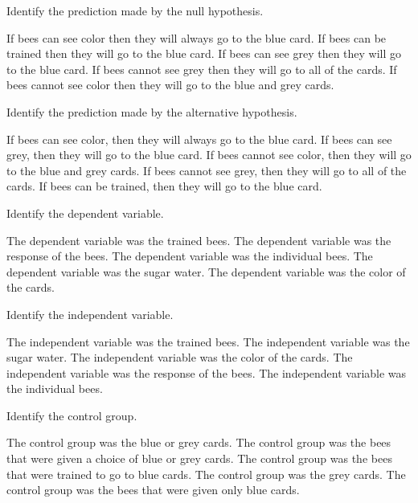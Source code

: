\question
Identify the prediction made by the null hypothesis.

\begin{choices}
\choice If bees can see color then they will always go to the blue card.
\choice If bees can be trained then they will go to the blue card.
\choice If bees can see grey then they will go to the blue card.
\choice If bees cannot see grey then they will go to all of the cards.
\correctchoice If bees cannot see color then they will go to the blue and grey cards.
\end{choices}

\question
Identify the prediction made by the alternative hypothesis.

\begin{choices}
\correctchoice If bees can see color, then they will always go to the blue card.
\choice If bees can see grey, then they will go to the blue card.
\choice If bees cannot see color, then they will go to the blue and grey cards.
\choice If bees cannot see grey, then they will go to all of the cards.
\choice If bees can be trained, then they will go to the blue card.
\end{choices}

\question
Identify the dependent variable.

\begin{choices}
\choice The dependent variable was the trained bees.
\correctchoice The dependent variable was the response of the bees.
\choice The dependent variable was the individual bees.
\choice The dependent variable was the sugar water.
\choice The dependent variable was the color of the cards.
\end{choices}

\question
Identify the independent variable.

\begin{choices}
\choice The independent variable was the trained bees.
\choice The independent variable was the sugar water.
\correctchoice The independent variable was the color of the cards.
\choice The independent variable was the response of the bees.
\choice The independent variable was the individual bees.
\end{choices}

\newpage


\question
Identify the control group.

\begin{choices}
\choice The control group was the blue or grey cards.
\choice The control group was the bees that were given a choice of blue or grey cards.
\choice The control group was the bees that were trained to go to blue cards.
\choice The control group was the grey cards.
\correctchoice The control group was the bees that were given only blue cards.
\end{choices}

